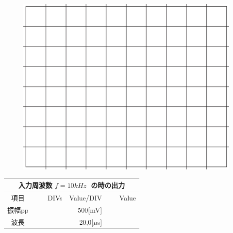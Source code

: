 \documentclass[uplatex,a4paper,11pt,oneside,openany]{jsbook}
\begin{document}
\begin{multicols}{2}
  \begin{figure}[H]
     \centering
      \includegraphics[keepaspectratio, scale=0.28, angle=0]
                  {figs/eps/grid.eps}
                  \label{fig:grid40mV}
  \end{figure}

  \begin{spacing}{1.5}
  \begin{tabular}{|c||r|r|r|}
    \multicolumn{4}{c}{入力周波数 $f=10kHz\;$ の時の出力} \\ \hline
    項目 & DIVs & Value/DIV & Value \\ \hline \hline
    振幅pp & 　　　　 & 500[mV]& 　　　　 \\ \hline
    波長 & 　　　　 & 20,0[$\mu$s]& 　　　　 \\ \hline
  \end{tabular}
\end{spacing}
\end{multicols}

\vfill
\end{document}
